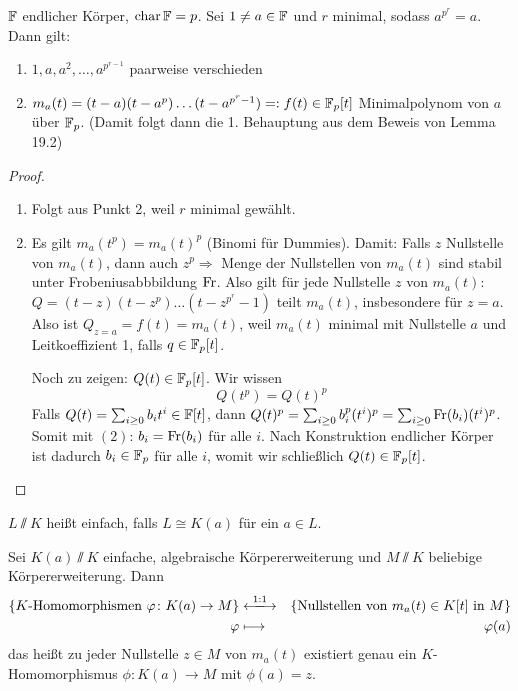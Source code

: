 \documentclass[12pt,a4paper]{scrartcl}
\begin{document}
\begin{satz} $\mathbb F$ endlicher Körper, $\operatorname{char} \mathbb F = p$. Sei $1\neq a\in\mathbb F$ und $r$ minimal, sodass $a^{p^r} =a$. Dann gilt:
	\begin{enumerate}
		\item $1, a, a^2,\dots, a^{p^{r-1}}$ paarweise verschieden
		\item $m_a(t) = (t-a)(t-a^p)\dots(t-a^{p^r-1}) =: f(t)\in\mathbb F_p[t]$ Minimalpolynom von $a$ über $\mathbb F_p$. \textup(Damit folgt dann die 1. Behauptung aus dem Beweis von Lemma 19.2\textup)
	\end{enumerate}
\end{satz}
\begin{proof}
	\leavevmode
	\begin{enumerate}
\item Folgt aus Punkt 2, weil $r$ minimal gewählt.
\item	Es gilt $m_a(t^p) = m_a(t)^p$ (Binomi für Dummies).
	Damit: Falls $z$ Nullstelle von $m_a(t)$, dann auch $z^p\Rightarrow$ Menge der Nullstellen von $m_a(t)$ sind stabil unter Frobeniusabbbildung $\operatorname{Fr}$.  Also gilt für jede Nullstelle $z$ von $m_a(t)$:  $Q = (t-z)(t-z^p)\dots(t-z^{p^r}-1)$ teilt $m_a(t)$, insbesondere für $z = a$. Also ist $Q_{z = a} = f(t) = m_a(t)$, weil $m_a(t)$ minimal mit Nullstelle $a$ und Leitkoeffizient 1, falls $q\in\mathbb F_p[t]$.
	
	Noch zu zeigen: $Q(t) \in\mathbb F_p[t]$. Wir wissen 
	\begin{equation}Q(t^p) = Q(t)^p\end{equation}
	 Falls $Q(t) = \sum_{i \geq 0}b_it^i\in\mathbb F[t]$, dann $Q(t)^p = \sum_{i \geq 0} b_i^p(t^i)^p = \sum_{i\geq 0} \operatorname{Fr}(b_i)(t^i)^p$. Somit mit $(2)$: $b_i = \operatorname{Fr}(b_i)$ für alle $i$. Nach Konstruktion endlicher Körper ist dadurch $b_i\in \mathbb F_p$ für alle $i$, womit wir schließlich $Q(t) \in\mathbb F_p[t]$.
  \qedhere
	\end{enumerate}
\end{proof}
\begin{defi} $L\sslash K$ heißt einfach, falls $L\cong K(a)$ für ein $a\in L$.
\end{defi}
\begin{satz}
	Sei $K(a)\sslash K$ einfache, algebraische Körpererweiterung und $M\sslash K$ beliebige Körpererweiterung. Dann
	\begin{eqnarray*}
		\{K\text{-Homomorphismen } \phi\colon K(a)\to M\} & \xlongleftrightarrow{1:1} & \{\text{Nullstellen von }m_a(t)\in K[t]\text{ in }M\}\\
		\phi &\longmapsto & \phi(a)
	\end{eqnarray*}
	das heißt zu jeder Nullstelle $z\in M$ von $m_a(t)$ existiert genau ein $K$-Homomorphismus $\phi\colon K(a)\to M$ mit $\phi(a) = z$. 
\end{satz}
\end{document}
